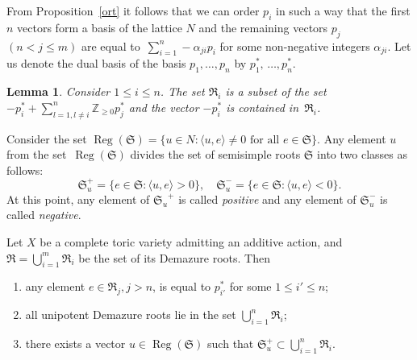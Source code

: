 \documentclass[a4paper,reqno,12pt]{amsart}
\DeclareMathOperator {\Reg}{Reg}
\def\Z  {\mathbb Z}
\newtheorem{lmm}{Lemma}
\theoremstyle{definition}
\begin{document}
From Proposition~\ref{ort} it follows that we can order $p_i$ in such a way that the first $n$ vectors form a basis of the lattice $N$ and the remaining vectors $p_j$ $(n < j \leq m)$ are equal to~$\sum_{i=1}^n-\alpha_{ji} p_i$ for some non-negative integers $\alpha_{ji}$.
Let us denote the dual basis of the basis $p_1, \ldots, p_n$ by $p_1^*,\,\ldots, p_n^*$.
\begin{lmm}{\cite[Lemma~2]{S}}\label{firstroot}
  Consider $1\leq i\leq n$.
  The set ${\mathfrak R}_i$ is a subset of the set~${-p_i^* + \sum\limits_{l=1,l\neq i}^n\Z_{\geq 0}p_j^*}$ and the vector $-p_i^*$ is contained in~${\mathfrak R}_i$.
 \end{lmm}
Consider the set $\Reg(\mathfrak S) =\{u \in N : \langle u, e \rangle \neq 0 \text{ for all } e \in \mathfrak S\}$.
Any element $u$ from the set~$\Reg(\mathfrak S)$ divides the set of semisimple roots $\mathfrak S$ into two classes as follows:
\[{\mathfrak S_{u}^+ =\{e \in \mathfrak S: \langle u, e\rangle > 0\}},\quad {\mathfrak S_{u}^- =\{e \in \mathfrak S: \langle u, e\rangle < 0\}}.\]
At this point, any element of ${\mathfrak S_{u}}^+$ is called \emph{positive} and any element of $\mathfrak S_{u}^-$ is called \emph{negative}.


\begin{stm}{\cite[Proposition 2]{S}}\label{selective}
  Let $X$ be a complete toric variety admitting an additive action, and ${\mathfrak R = \bigcup\limits_{i=1}^{m} \mathfrak R_i}$ be the set of its Demazure roots.
  Then
  \begin{enumerate}
  \item any element $e \in  \mathfrak R_j, j > n$, is equal to $p_{i'}^*$ for some $1 \leq i'\leq n$;
  \item all unipotent Demazure roots lie in the set $\bigcup\limits_{i=1}^{n}\mathfrak R_i$;
  \item there exists a vector $u\in \Reg(\mathfrak S)$ such that $\mathfrak S_{u}^+ \subset \bigcup\limits_{i=1}^n \mathfrak R_i$.
  \end{enumerate}
\end{stm}
\end{document}
